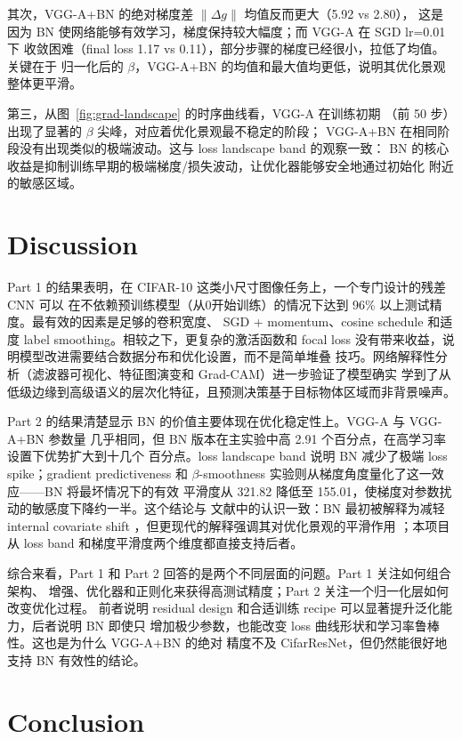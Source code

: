 \documentclass[11pt,a4paper]{ctexart}
\begin{document}
其次，VGG-A+BN 的绝对梯度差 $\lVert\Delta g\rVert$ 均值反而更大（5.92 vs 2.80），
这是因为 BN 使网络能够有效学习，梯度保持较大幅度；而 VGG-A 在 SGD lr=0.01 下
收敛困难（final loss 1.17 vs 0.11），部分步骤的梯度已经很小，拉低了均值。关键在于
归一化后的 $\beta$，VGG-A+BN 的均值和最大值均更低，说明其优化景观整体更平滑。

第三，从图~\ref{fig:grad-landscape} 的时序曲线看，VGG-A 在训练初期
（前 50 步）出现了显著的 $\beta$ 尖峰，对应着优化景观最不稳定的阶段；
VGG-A+BN 在相同阶段没有出现类似的极端波动。这与 loss landscape band 的观察一致：
BN 的核心收益是抑制训练早期的极端梯度/损失波动，让优化器能够安全地通过初始化
附近的敏感区域。

\section{Discussion}

Part 1 的结果表明，在 CIFAR-10 这类小尺寸图像任务上，一个专门设计的残差 CNN 可以
在不依赖预训练模型（从0开始训练）的情况下达到 96\% 以上测试精度。最有效的因素是足够的卷积宽度、
SGD + momentum、cosine schedule 和适度 label smoothing。相较之下，更复杂的激活函数和
focal loss 没有带来收益，说明模型改进需要结合数据分布和优化设置，而不是简单堆叠
技巧。网络解释性分析（滤波器可视化、特征图演变和 Grad-CAM）进一步验证了模型确实
学到了从低级边缘到高级语义的层次化特征，且预测决策基于目标物体区域而非背景噪声。

Part 2 的结果清楚显示 BN 的价值主要体现在优化稳定性上。VGG-A 与 VGG-A+BN 参数量
几乎相同，但 BN 版本在主实验中高 2.91 个百分点，在高学习率设置下优势扩大到十几个
百分点。loss landscape band 说明 BN 减少了极端 loss spike；gradient predictiveness
和 $\beta$-smoothness 实验则从梯度角度量化了这一效应——BN 将最坏情况下的有效
平滑度从 321.82 降低至 155.01，使梯度对参数扰动的敏感度下降约一半。这个结论与
文献中的认识一致：BN 最初被解释为减轻 internal covariate shift
\cite{ioffe2015batch}，但更现代的解释强调其对优化景观的平滑作用
\cite{santurkar2018batch}；本项目从 loss band 和梯度平滑度两个维度都直接支持后者。

综合来看，Part 1 和 Part 2 回答的是两个不同层面的问题。Part 1 关注如何组合架构、
增强、优化器和正则化来获得高测试精度；Part 2 关注一个归一化层如何改变优化过程。
前者说明 residual design 和合适训练 recipe 可以显著提升泛化能力，后者说明 BN 即使只
增加极少参数，也能改变 loss 曲线形状和学习率鲁棒性。这也是为什么 VGG-A+BN 的绝对
精度不及 CifarResNet，但仍然能很好地支持 BN 有效性的结论。

\section{Conclusion}
\end{document}

